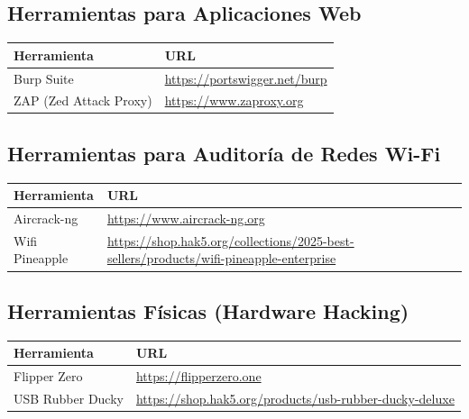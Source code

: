 \documentclass[a4paper, 11pt]{article}
\begin{document}
\subsection*{Herramientas para Aplicaciones Web}
\begin{table}[H]
\centering
\begin{tabular}{|m{5cm}|m{10cm}|}
\hline
\textbf{Herramienta} & \textbf{URL} \\
\hline
Burp Suite & \url{https://portswigger.net/burp} \\
\hline
ZAP (Zed Attack Proxy) & \url{https://www.zaproxy.org} \\
\hline
\end{tabular}
\end{table}

\subsection*{Herramientas para Auditoría de Redes Wi-Fi}
\begin{table}[H]
\centering
\begin{tabular}{|m{5cm}|m{10cm}|}
\hline
\textbf{Herramienta} & \textbf{URL} \\
\hline
Aircrack-ng & \url{https://www.aircrack-ng.org} \\
\hline
Wifi Pineapple & \url{https://shop.hak5.org/collections/2025-best-sellers/products/wifi-pineapple-enterprise} \\
\hline
\end{tabular}
\end{table}

\subsection*{Herramientas Físicas (Hardware Hacking)}
\begin{table}[H]
\centering
\begin{tabular}{|m{5cm}|m{10cm}|}
\hline
\textbf{Herramienta} & \textbf{URL} \\
\hline
Flipper Zero & \url{https://flipperzero.one} \\
\hline
USB Rubber Ducky & \url{https://shop.hak5.org/products/usb-rubber-ducky-deluxe} \\
\hline
\end{tabular}
\end{table}
\end{document}
